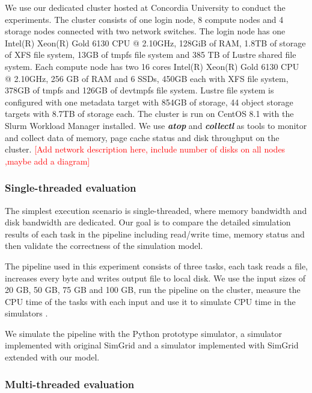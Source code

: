 \documentclass[conference]{IEEEtran}
\begin{document}
			We use our dedicated cluster hosted at Concordia University to conduct 
			the experiments. The cluster consists of one login node, 8 compute nodes 
			and 4 storage nodes connected with two network switches. The login node 
			has one Intel(R) Xeon(R) Gold 6130 CPU @ 2.10GHz, 128GiB of RAM, 1.8TB 
			of storage of XFS file system, 13GB of tmpfs file system and 385 TB of 
			Lustre shared file system. Each compute node has two 16 cores Intel(R) 
			Xeon(R) Gold 6130 CPU @ 2.10GHz, 256 GB of RAM and 6 SSDs, 450GB each 
			with XFS file system, 378GB of tmpfs and 126GB of devtmpfs file system.
			Lustre file system is configured with one metadata target with 854GB 
			of storage, 44 object storage targets with 8.7TB of storage each. 
			The cluster is run on CentOS 8.1 with the Slurm Workload Manager installed. 
			We use \textbf{\textit{atop}} and \textbf{\textit{collectl}} as tools to 
			monitor and collect data of memory, page cache status and disk throughput 
			on the cluster. 
			\textcolor{red}{[Add network description here, include number of disks 
			on all nodes ,maybe add a diagram]}
			
			\subsubsection{Single-threaded evaluation}
			
			The simplest execution scenario is single-threaded, where memory 
			bandwidth and disk bandwidth are dedicated. Our goal is to 
			compare the detailed simulation results of each task in the pipeline 
			including read/write time, memory status and then validate the correctness 
			of the simulation model. 

			The pipeline used in this experiment consists of three tasks, 
			each task reads a file, increases every byte and writes output file 
			to local disk. 
			We use the input sizes of 20 GB, 50 GB, 75 GB and 100 GB, run 
			the pipeline on the cluster, measure the CPU time of the tasks  
			with each input and use it to simulate CPU time in the simulators .

			We simulate the pipeline with the Python prototype simulator, 
			a simulator implemented with original SimGrid and a simulator implemented 
			with SimGrid extended with our model.  
			
			\subsubsection{Multi-threaded evaluation}
\end{document}
